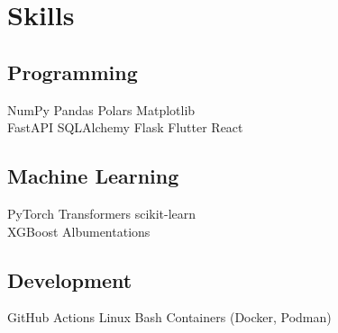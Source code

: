 \documentclass[]{resume-template}
\begin{document}
\begin{minipage}[t]{0.33\textwidth}
  \section{Skills}\label{sec:skills}
  \subsection{Programming}\label{subsec:programming}
  NumPy\textbullet{} Pandas\textbullet{} Polars\textbullet{} Matplotlib\\
  FastAPI \textbullet{} SQLAlchemy \textbullet{} Flask
  \newline{}
  Flutter \textbullet{} React

  \vspace*{1pt}
  \subsection{Machine Learning}\label{subsec:mltools}
  PyTorch \textbullet{} Transformers \textbullet{} scikit-learn \\
  XGBoost \textbullet{} Albumentations

  \vspace*{1pt}
  \subsection{Development}
  GitHub Actions\textbullet{}  Linux \textbullet{} Bash \textbullet{}
  Containers (Docker, Podman)



\end{minipage}
\end{document}
